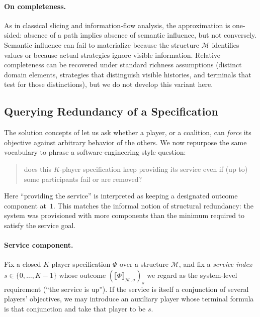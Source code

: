 \paragraph{On completeness.}
As in classical slicing and information-flow analysis, the approximation is one-sided: absence of a path implies absence of semantic influence, but not conversely.
Semantic influence can fail to materialize because the structure $\mathcal M$ identifies values or because actual strategies ignore visible information.
Relative completeness can be recovered under standard richness assumptions (distinct domain elements, strategies that distinguish visible histories, and terminals that test for those distinctions), but we do not develop this variant here.


\subsection{Querying Redundancy of a Specification}
\label{subsec:redundancy-query}

The solution concepts of  let us ask whether a player, or a
coalition, can \emph{force} its objective against arbitrary behavior of the
others. We now repurpose the same vocabulary to phrase a software-engineering
style question:

\begin{quote}
  does this $K$-player specification keep providing its service even if
  (up to) some participants fail or are removed?
\end{quote}

Here ``providing the service'' is interpreted as keeping a designated outcome
component at~$1$. This matches the informal notion of structural redundancy:
the system was provisioned with more components than the minimum required to
satisfy the service goal.

\paragraph{Service component.}
Fix a closed $K$-player specification $\Phi$ over a structure $\mathcal M$, and
fix a \emph{service index} $s \in \{0,\dots,K-1\}$ whose outcome
$(\llbracket \Phi \rrbracket_{\mathcal M,\sigma})_s$ we regard as the
system-level requirement (``the service is up''). If the service is itself a
conjunction of several players' objectives, we may introduce an auxiliary
player whose terminal formula is that conjunction and take that player to be
$s$.

